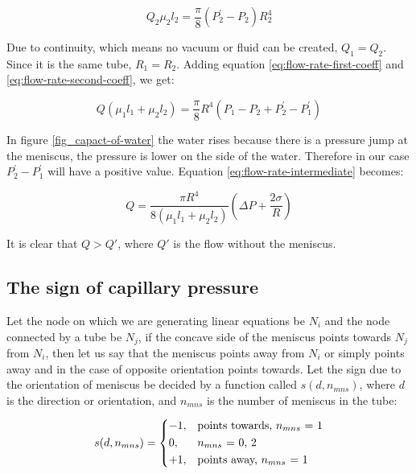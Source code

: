 	\begin{equation} \label{eq:flow-rate-second-coeff}
		Q_2 {\mu}_2 l_2 = \frac{\pi}{8} (P^{'}_2 - P_2) R_2^4
	\end{equation}

	Due to continuity, which means no vacuum or fluid can be created, $Q_1 = Q_2$. Since it is the same tube, $R_1 = R_2$. Adding equation \ref{eq:flow-rate-first-coeff} and \ref{eq:flow-rate-second-coeff}, we get:
	
	\begin{equation} \label{eq:flow-rate-intermediate}
		Q({\mu}_1 l_1 + {\mu}_2 l_2) = \frac{\pi}{8}R^4(P_1 - P_2 + P^{'}_2 - P^{'}_1)
	\end{equation}

	In figure \ref{fig_capact-of-water} the water rises because there is a pressure jump at the meniscus, the pressure is lower on the side of the water. Therefore in our case $P^{'}_2 - P^{'}_1$ will have a positive value. Equation \ref{eq:flow-rate-intermediate} becomes:
	
	\begin{equation} \label{eq:flow-rate-1mns-basic}
		Q = \frac{\pi R^4}{8({\mu}_1 l_1 + {\mu}_2 l_2)} \left( \Delta P + \frac{2\sigma}{R} \right)
	\end{equation}
	
	It is clear that $Q > Q'$, where $Q'$ is the flow without the meniscus.
	
	
\subsection{The sign of capillary pressure}

	Let the node on which we are generating linear equations be $N_i$ and the node connected by a tube be $N_j$, if the concave side of the meniscus points towards $N_j$ from $N_i$, then let us say that the meniscus points away from $N_i$ or simply points away and in the case of opposite orientation points towards. Let the sign due to the orientation of meniscus be decided by a function called $s(d, n_{mns})$, where $d$ is the direction or orientation, and $n_{mns}$ is the number of meniscus in the tube:
	
	\begin{equation}
		s(d, n_{mns}) = 
		\begin{dcases}
			-1,&\text{points towards, $n_{mns}$ = 1}\\
			0,&\text{$n_{mns}$ = 0, 2}\\
			+1,&\text{points away, $n_{mns}$ = 1}
		\end{dcases}
	\end{equation}

